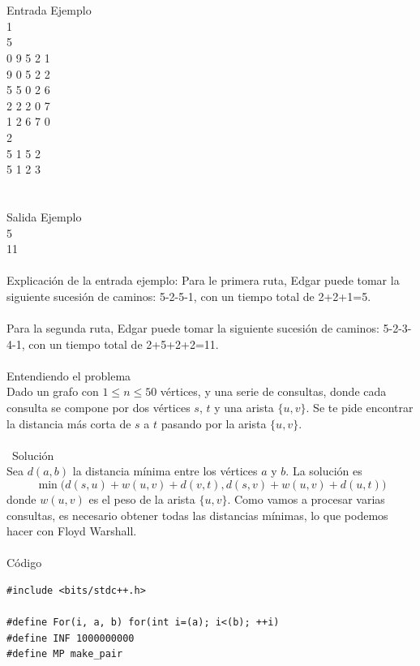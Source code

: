 \documentclass[12pt]{article}
\begin{document}
{{{\\
\\
\textrm{\large Entrada Ejemplo}
\\
1\\
5\\
0 9 5 2 1\\
9 0 5 2 2\\
5 5 0 2 6\\
2 2 2 0 7\\
1 2 6 7 0\\
2\\
5 1 5 2\\
5 1 2 3\\
\\
\\
\textrm{\large Salida Ejemplo}
\\
5\\
11\\
\\Explicación de la entrada ejemplo:
Para le primera ruta, Edgar puede tomar la siguiente sucesión de caminos: 5-2-5-1, con un tiempo total de 2+2+1=5.\\
\\Para la segunda ruta, Edgar puede tomar la siguiente sucesión de caminos: 5-2-3-4-1, con un tiempo total de 2+5+2+2=11.\\
\\
\textrm{\large Entendiendo el problema}\\
Dado un grafo con $1 \leq n \leq 50$ vértices, y una serie de consultas, donde cada consulta se compone por dos vértices $s$, $t$ y una arista $\{u, v\}$. Se te pide encontrar la distancia más corta de $s$ a $t$ pasando por la arista $\{u, v\}$.\\
\\\
\textrm{\large Solución}\\
Sea $d(a, b)$ la distancia mínima entre los vértices $a$ y $b$. La solución es \[ \min\big(d(s,u) + w(u,v) + d(v,t), d(s,v) + w(u, v) + d(u, t)\big) \]
donde $w(u, v)$ es el peso de la arista $\{u, v\}$. Como vamos a procesar varias consultas, es necesario obtener todas las distancias mínimas, lo que podemos hacer con Floyd Warshall.\\
\\
\textrm{\large Código}\\
\begin{verbatim}
#include <bits/stdc++.h>
 
#define For(i, a, b) for(int i=(a); i<(b); ++i)
#define INF 1000000000
#define MP make_pair
 

\end{verbatim}}}}
\end{document}
